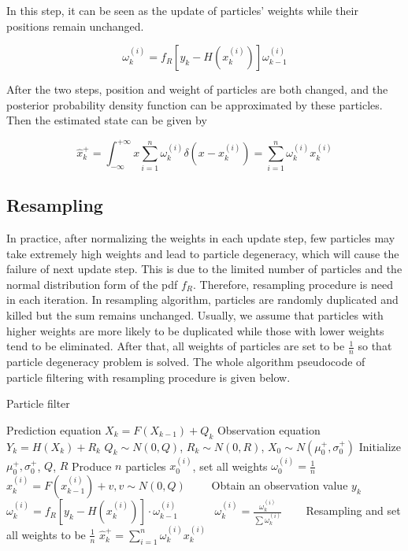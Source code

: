 \documentclass[conference]{IEEEtran}
\begin{document}
	In this step, it can be seen as the update of particles' weights while their positions remain unchanged.
	
	\begin{equation}
		\omega_{k}^{(i)}=f_{R}[y_{k}-H(x_{k}^{(i)})]\omega_{k-1}^{(i)}
		\label{eq27}
	\end{equation}
	
	After the two steps, position and weight of particles are both changed, and the posterior probability density function can be approximated by these particles. Then the estimated state can be given by
	
	\begin{equation}
	\hat{x}_{k}^{+}=\int_{-\infty}^{+\infty}x\sum_{i=1}^{n}\omega_{k}^{(i)}\delta (x-x_{k}^{(i)})=\sum_{i=1}^{n}\omega_{k}^{(i)}x_{k}^{(i)}
	\label{eq28}
	\end{equation}
	
	
	\subsection{Resampling}
	
	In practice, after normalizing the weights in each update step, few particles may take extremely high weights and lead to particle degeneracy, which will cause the failure of next update step. This is due to the limited number of particles and the normal distribution form of the pdf $f_{R}$. Therefore, resampling procedure is need in each iteration. In resampling algorithm, particles are randomly duplicated and killed but the sum remains unchanged. Usually, we assume that particles with higher weights are more likely to be duplicated while those with lower weights tend to be eliminated. After that, all weights of particles are set to be $\frac{1}{n}$ so that particle degeneracy problem is solved. The whole algorithm pseudocode of particle filtering with resampling procedure is given below.
	
	
	\begin{algorithm}
		\caption{Particle filter}
		\begin{algorithmic}  
			\STATE Prediction equation $X_{k}=F(X_{k-1})+Q_{k}$
			\STATE Observation equation $Y_{k}=H(X_{k})+R_{k}$
			\STATE $Q_{k}\sim N(0,Q)$, $R_{k}\sim N(0,R)$, $X_{0}\sim N(\mu_{0}^{+}, \sigma_{0}^{+})$
			\STATE Initialize $ \mu_{0}^{+}, \sigma_{0}^{+}$, $Q$, $R$
			\STATE Produce $n$ particles $x_{0}^{(i)}$, set all weights $\omega_{0}^{(i)}=\frac{1}{n}$
			\STATE $x_{k}^{(i)}=F(x_{k-1}^{(i)})+v, v\sim N(0,Q)$\ \ \ \ 
			\STATE Obtain an observation value $y_{k}$
			\STATE $\omega_{k}^{(i)}=f_{R}[y_{k}-H(x_{k}^{(i)})]\cdot \omega_{k-1}^{(i)}$\ \ \ \ \ \ 
			\STATE $\omega_{k}^{(i)}=\frac{\omega_{k}^{(i)}}{\sum \omega_{k}^{(i)}}$ \qquad \qquad \qquad \qquad \ \ \ 
			\STATE Resampling and set all weights to be $\frac{1}{n}$
			\STATE $\hat{x}_{k}^{+}=\sum_{i=1}^{n}\omega_{k}^{(i)}x_{k}^{(i)}$
			\ENDFOR
		\end{algorithmic}
	\end{algorithm}
	
\end{document}
